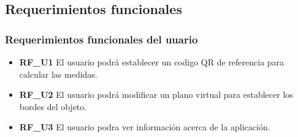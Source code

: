\subsection{Requerimientos funcionales}
\subsubsection{Requerimientos funcionales del uuario}

\begin{itemize}
\item \textbf{RF\_U1} El usuario podrá establecer un codigo QR de referencia para calcular las medidas.
\item \textbf{RF\_U2} El usuario podrá modificar un plano virtual para establecer los bordes del objeto.
\item \textbf{RF\_U3} El usuario podra ver información acerca de la aplicación.


\end{itemize}